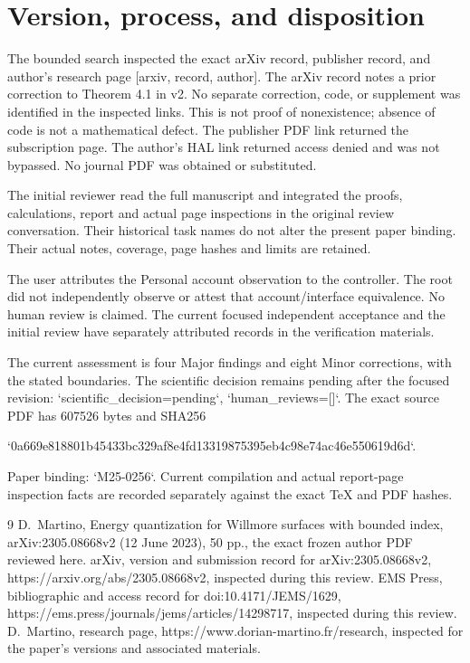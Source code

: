 \documentclass[10pt]{article}
\begin{document}
\section*{Version, process, and disposition}
The bounded search inspected the exact arXiv record, publisher record, and author’s research page [arxiv, record, author]. The arXiv record notes a prior correction to Theorem 4.1 in v2. No separate correction, code, or supplement was identified in the inspected links. This is not proof of nonexistence; absence of code is not a mathematical defect. The publisher PDF link returned the subscription page. The author’s HAL link returned access denied and was not bypassed. No journal PDF was obtained or substituted.\par
The initial reviewer read the full manuscript and integrated the proofs, calculations, report and actual page inspections in the original review conversation. Their historical task names do not alter the present paper binding. Their actual notes, coverage, page hashes and limits are retained.\par
The user attributes the Personal account observation to the controller. The root did not independently observe or attest that account/interface equivalence. No human review is claimed. The current focused independent acceptance and the initial review have separately attributed records in the verification materials.\par
The current assessment is four Major findings and eight Minor corrections, with the stated boundaries. The scientific decision remains pending after the focused revision: `scientific\_decision=pending`, `human\_reviews=[]`. The exact source PDF has 607526 bytes and SHA256\par
`0a669e818801b45433bc329af8e4fd13319875395eb4c98e74ac46e550619d6d`.\par
Paper binding: `M25-0256`. Current compilation and actual report-page inspection facts are recorded separately against the exact TeX and PDF hashes.\par
9 D. Martino, Energy quantization for Willmore surfaces with bounded index, arXiv:2305.08668v2 (12 June 2023), 50 pp., the exact frozen author PDF reviewed here. arXiv, version and submission record for arXiv:2305.08668v2, https://arxiv.org/abs/2305.08668v2, inspected during this review. EMS Press, bibliographic and access record for doi:10.4171/JEMS/1629, https://ems.press/journals/jems/articles/14298717, inspected during this review. D. Martino, research page, https://www.dorian-martino.fr/research, inspected for the paper’s versions and associated materials.\par
\end{document}
